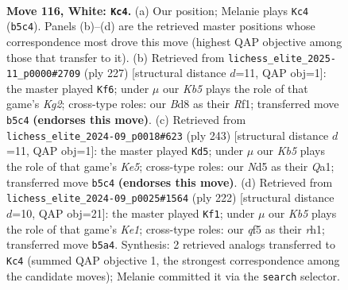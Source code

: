 \documentclass[11pt]{article}
\begin{document}
\clearpage

\begin{figure}[p]\centering
\begin{subfigure}{0.46\textwidth}\centering
\resizebox{\linewidth}{!}{%
\newchessgame
\chessboard[
  setfen={3B4/1k6/8/1K1N1q2/8/8/8/8 w - - 0 116},
  showmover=false,
  pgfstyle=straightmove, color=movearrow, markmove={b5-c4}
]}
\caption{}
\end{subfigure}\hfill
\begin{subfigure}{0.46\textwidth}\centering
\resizebox{\linewidth}{!}{%
\newchessgame
\chessboard[
  setfen={8/6k1/3K4/8/6Q1/8/8/5r2 b - - 36 114},
  showmover=false,
  pgfstyle=straightmove, color=movearrow, markmove={g7-f6}
]}
\caption{}
\end{subfigure}
\\[4pt]
\begin{subfigure}{0.46\textwidth}\centering
\resizebox{\linewidth}{!}{%
\newchessgame
\chessboard[
  setfen={8/8/8/8/4k2Q/1K6/8/q7 b - - 1 122},
  showmover=false,
  pgfstyle=straightmove, color=movearrow, markmove={e4-d5}
]}
\caption{}
\end{subfigure}\hfill
\begin{subfigure}{0.46\textwidth}\centering
\resizebox{\linewidth}{!}{%
\newchessgame
\chessboard[
  setfen={8/8/8/8/8/4k3/8/4K1Nr w - - 78 112},
  showmover=false,
  pgfstyle=straightmove, color=movearrow, markmove={e1-f1}
]}
\caption{}
\end{subfigure}
\caption{\textbf{Move 116, White: \texttt{Kc4}.} (a) Our position; Melanie plays \texttt{Kc4} (\texttt{b5c4}). Panels (b)--(d) are the retrieved master positions whose correspondence most drove this move (highest QAP objective among those that transfer to it). (b) Retrieved from \texttt{lichess\_elite\_2025-11\_p0000\#2709} (ply 227) [structural distance $d$=11, QAP obj=1]: the master played \texttt{Kf6}; under $\mu$ our \emph{Kb5} plays the role of that game's \emph{Kg2}; cross-type roles: our \emph{B}d8 as their \emph{R}f1; transferred move \texttt{b5c4} \textbf{(endorses this move)}. (c) Retrieved from \texttt{lichess\_elite\_2024-09\_p0018\#623} (ply 243) [structural distance $d$=11, QAP obj=1]: the master played \texttt{Kd5}; under $\mu$ our \emph{Kb5} plays the role of that game's \emph{Ke5}; cross-type roles: our \emph{N}d5 as their \emph{Q}a1; transferred move \texttt{b5c4} \textbf{(endorses this move)}. (d) Retrieved from \texttt{lichess\_elite\_2024-09\_p0025\#1564} (ply 222) [structural distance $d$=10, QAP obj=21]: the master played \texttt{Kf1}; under $\mu$ our \emph{Kb5} plays the role of that game's \emph{Ke1}; cross-type roles: our \emph{q}f5 as their \emph{r}h1; transferred move \texttt{b5a4}. Synthesis: 2 retrieved analogs transferred to \texttt{Kc4} (summed QAP objective 1, the strongest correspondence among the candidate moves); Melanie committed it via the \texttt{search} selector.}
\label{fig:thought-m230}
\end{figure}
\end{document}
